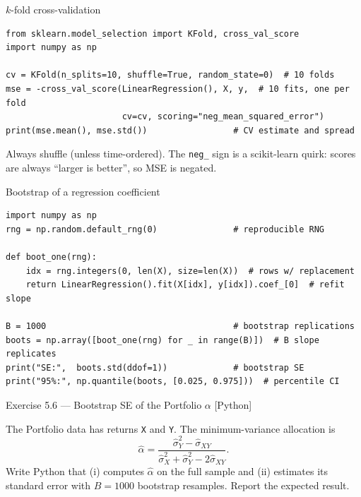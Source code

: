 \documentclass[aspectratio=169,11pt]{beamer}
\begin{document}
\begin{frame}[fragile]{$k$-fold cross-validation}
  \begin{lstlisting}
from sklearn.model_selection import KFold, cross_val_score
import numpy as np

cv = KFold(n_splits=10, shuffle=True, random_state=0)  # 10 folds
mse = -cross_val_score(LinearRegression(), X, y,  # 10 fits, one per fold
                       cv=cv, scoring="neg_mean_squared_error")
print(mse.mean(), mse.std())                 # CV estimate and spread
  \end{lstlisting}
  Always shuffle (unless time-ordered). The \texttt{neg\_} sign is a
  scikit-learn quirk: scores are always ``larger is better'', so MSE
  is negated.
\end{frame}

\begin{frame}[fragile]{Bootstrap of a regression coefficient}
  \begin{lstlisting}
import numpy as np
rng = np.random.default_rng(0)               # reproducible RNG

def boot_one(rng):
    idx = rng.integers(0, len(X), size=len(X))  # rows w/ replacement
    return LinearRegression().fit(X[idx], y[idx]).coef_[0]  # refit slope

B = 1000                                     # bootstrap replications
boots = np.array([boot_one(rng) for _ in range(B)])  # B slope replicates
print("SE:",  boots.std(ddof=1))             # bootstrap SE
print("95%:", np.quantile(boots, [0.025, 0.975]))  # percentile CI
  \end{lstlisting}
\end{frame}

\begin{frame}[fragile]{Exercise 5.6 --- Bootstrap SE of the Portfolio $\alpha$ [Python]}
  \begin{exercise}
    The Portfolio data has returns \texttt{X} and \texttt{Y}. The
    minimum-variance allocation is
    \[
      \hat\alpha =
      \frac{\hat\sigma_Y^2 - \hat\sigma_{XY}}
           {\hat\sigma_X^2 + \hat\sigma_Y^2 - 2\hat\sigma_{XY}} .
    \]
    Write Python that (i) computes $\hat\alpha$ on the full sample and
    (ii) estimates its standard error with $B = 1000$ bootstrap
    resamples. Report the expected result.
  \end{exercise}
\end{frame}
\end{document}
